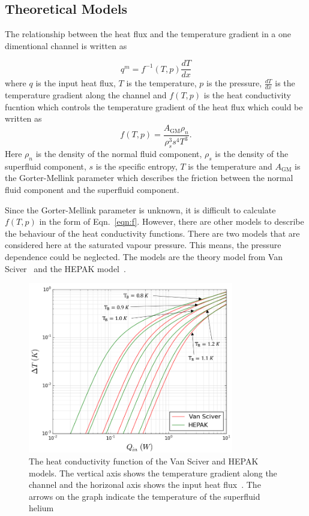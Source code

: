 \subsection{Theoretical Models}
The relationship between the heat flux and the temperature gradient in
a one dimentional channel is written as

\begin{equation}
  \label{eqn:q_dT}
  q^m = f^{-1}\left(T, p \right) \frac{dT}{dx}
\end{equation}
where $q$ is the input heat flux, $T$ is the temperature, $p$ is the
pressure, $\frac{dT}{dx}$ is the temperature gradient along the
channel and $f\left(T, p \right)$ is the heat conductivity fucntion
which controls the temperature gradient of the heat flux which could
be written as
\begin{equation}
  \label{eqn:f}
f \left( T, p \right) = \frac{A_\mathrm{GM}\rho_n}{\rho_s^{3}s^4T^3}.
\end{equation}
Here $\rho_n$ is the density of the normal fluid component, $\rho_s$
is the density of the superfluid component, $s$ is the specific
entropy, $T$ is the temperature and $A_\mathrm{GM}$ is the
Gorter-Mellink parameter which describes the friction between the
normal fluid component and the superfluid component.

Since the Gorter-Mellink parameter is unknown, it is difficult to
calculate $f \left( T, p \right)$ in the form of
Eqn.~\ref{eqn:f}. However, there are other models to describe the
behaviour of the heat conductivity functions. There are two models
that are considered here at the saturated vapour pressure. This means,
the pressure dependence could be neglected. The models are the theory
model from Van Sciver~\cite{van2012helium} and the HEPAK
model~\cite{arp2005hepak}. %

\begin{figure}[h!]
  \centering \includegraphics[width=0.8\textwidth]{VanSciver_vs_HEPAK.png}
  \caption{The heat conductivity function of the Van Sciver and HEPAK
    models. The vertical axis shows the temperature gradient along the
    channel and the horizonal axis shows the input heat
    flux~\cite{Florian_thesis}. The arrows on the graph indicate the
    temperature of the superfluid helium}
\label{fig:VanSciver_vs_HEPAK}
\end{figure}

